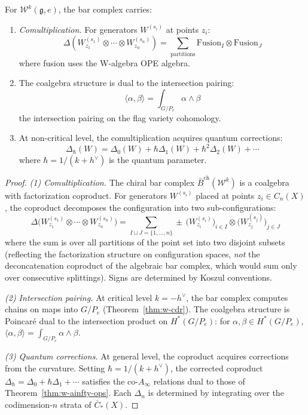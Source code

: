 \begin{theorem}\label{thm:w-bar-coalg}
For $\mathcal{W}^k(\mathfrak{g}, e)$, the bar complex carries:
\begin{enumerate}
\item \emph{Comultiplication.} For generators $W^{(s_i)}$ at points $z_i$:
\[
\Delta(W^{(s_1)}_{z_1} \otimes \cdots \otimes W^{(s_n)}_{z_n}) = 
\sum_{\text{partitions}} \mathrm{Fusion}_I \otimes \mathrm{Fusion}_J
\]
where fusion uses the W-algebra OPE algebra.

\item The coalgebra structure is dual to the intersection pairing:
\[
\langle \alpha, \beta \rangle = \int_{G/P_e} \alpha \wedge \beta
\]
the intersection pairing on the flag variety cohomology.

\item At non-critical level, the comultiplication acquires quantum corrections:
\[
\Delta_{\hbar}(W) = \Delta_0(W) + \hbar \Delta_1(W) + \hbar^2 \Delta_2(W) + \cdots
\]
where $\hbar = 1/(k + h^\vee)$ is the quantum parameter.
\end{enumerate}
\end{theorem}

\begin{proof}
\emph{(1) Comultiplication.}  The chiral bar complex $\bar{B}^{\mathrm{ch}}(\mathcal{W}^k)$ is a coalgebra with factorization coproduct.  For generators $W^{(s_i)}$ placed at points $z_i \in C_n(X)$, the coproduct decomposes the configuration into two sub-configurations:
\[
\Delta\bigl(W^{(s_1)}_{z_1} \otimes \cdots \otimes W^{(s_n)}_{z_n}\bigr) = \sum_{I \sqcup J = \{1,\ldots,n\}} \pm\, \bigl(W^{(s_i)}_{z_i}\bigr)_{i \in I} \otimes \bigl(W^{(s_j)}_{z_j}\bigr)_{j \in J}
\]
where the sum is over all partitions of the point set into two disjoint subsets (reflecting the factorization structure on configuration spaces, \emph{not} the deconcatenation coproduct of the algebraic bar complex, which would sum only over consecutive splittings).  Signs are determined by Koszul conventions.

\emph{(2) Intersection pairing.}  At critical level $k = -h^\vee$, the bar complex computes chains on maps into $G/P_e$ (Theorem~\ref{thm:w-cdr}).  The coalgebra structure is Poincar\'e dual to the intersection product on $H^*(G/P_e)$: for $\alpha, \beta \in H^*(G/P_e)$, $\langle \alpha, \beta \rangle = \int_{G/P_e} \alpha \wedge \beta$.

\emph{(3) Quantum corrections.}  At general level, the coproduct acquires corrections from the curvature.  Setting $\hbar = 1/(k + h^\vee)$, the corrected coproduct $\Delta_\hbar = \Delta_0 + \hbar \Delta_1 + \cdots$ satisfies the co-$A_\infty$ relations dual to those of Theorem~\ref{thm:w-ainfty-ops}.  Each $\Delta_n$ is determined by integrating over the codimension-$n$ strata of $\overline{C}_*(X)$.
\end{proof}

